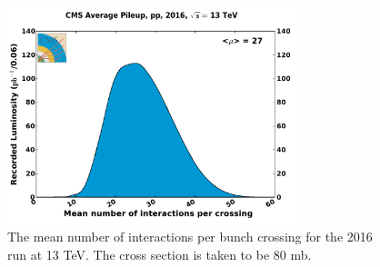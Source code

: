\begin{figure}
	\centering
	\includegraphics[width=0.75\textwidth]{detector/figs/pileup_pp_2016}
	\renewcommand{\baselinestretch}{1.0}
	\caption[The mean number of interactions per bunch crossing for the 2016 run at 13 TeV.]{The mean number of interactions per bunch crossing for the 2016 run at 13 TeV. The cross section is taken to be 80 mb.}
	\label{fig:pileup2016}
\end{figure}

